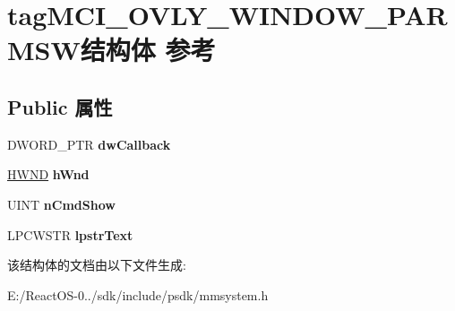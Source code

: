 \hypertarget{structtag_m_c_i___o_v_l_y___w_i_n_d_o_w___p_a_r_m_s_w}{}\section{tag\+M\+C\+I\+\_\+\+O\+V\+L\+Y\+\_\+\+W\+I\+N\+D\+O\+W\+\_\+\+P\+A\+R\+M\+S\+W结构体 参考}
\label{structtag_m_c_i___o_v_l_y___w_i_n_d_o_w___p_a_r_m_s_w}
\subsection*{Public 属性}
\begin{DoxyCompactItemize}
\item 
\mbox{\label{structtag_m_c_i___o_v_l_y___w_i_n_d_o_w___p_a_r_m_s_w_a13b80c41e92f06b3b160161bc674bc3a}} 
D\+W\+O\+R\+D\+\_\+\+P\+TR {\bfseries dw\+Callback}
\item 
\mbox{\label{structtag_m_c_i___o_v_l_y___w_i_n_d_o_w___p_a_r_m_s_w_a5d9986ff7866e35d4da52d3191f395dc}} 
\hyperlink{interfacevoid}{H\+W\+ND} {\bfseries h\+Wnd}
\item 
\mbox{\label{structtag_m_c_i___o_v_l_y___w_i_n_d_o_w___p_a_r_m_s_w_a1f34fd223a11ae360eec8de2bd2962f4}} 
U\+I\+NT {\bfseries n\+Cmd\+Show}
\item 
\mbox{\label{structtag_m_c_i___o_v_l_y___w_i_n_d_o_w___p_a_r_m_s_w_adda14b32756b494c8198a69fbfdd57ef}} 
L\+P\+C\+W\+S\+TR {\bfseries lpstr\+Text}
\end{DoxyCompactItemize}


该结构体的文档由以下文件生成\+:\begin{DoxyCompactItemize}
\item 
E\+:/\+React\+O\+S-\/0../sdk/include/psdk/mmsystem.\+h\end{DoxyCompactItemize}
